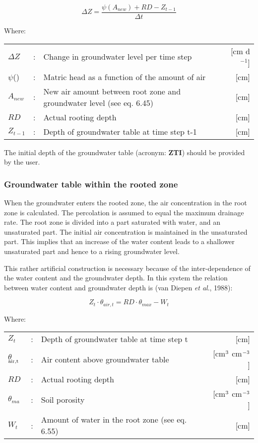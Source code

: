 \begin{equation}
\Delta Z = {\frac{\psi (A_{new} ) + RD - Z_{t-1}}{\Delta t}}
\end{equation}

Where:\\[5pt]
\begin{tabularx}{\textwidth}{llXr}
$\Delta Z$ &:& Change in groundwater level per time step  & [cm d$^{ -1}$]\\
$\psi$() &:& Matric head as a function of the amount of air  & [cm]\\
$A_{new}$ &:& New air amount between root zone and groundwater
   level (see eq. 6.45)  & [cm]\\
$RD$ &:& Actual rooting depth  & [cm]\\
$Z_{t-1}$ &:& Depth of groundwater table at time step t-1  & [cm]
\end{tabularx}

The initial depth of the groundwater table (acronym: {\bf ZTI}) should be provided by the
user. 

\subsubsection{Groundwater table within the rooted zone}
When the groundwater enters the rooted zone, the air concentration in the root zone is
calculated. The percolation is assumed to equal the maximum drainage rate. The root
zone is divided into a part saturated with water, and an unsaturated part. The initial air
concentration is maintained in the unsaturated part. This implies that an increase of the
water content leads to a shallower unsaturated part and hence to a rising groundwater
level.

This rather artificial construction is necessary because of the inter-dependence of the
water content and the groundwater depth. In this system the relation between water
content and groundwater depth is (van Diepen {\it et al}., 1988):

\begin{equation}
Z_{t} \cdot \theta_{air,t} = RD \cdot \theta_{max} - W_{t} 
\end{equation}

Where:\\[5pt]
\begin{tabularx}{\textwidth}{llXr}
$Z_{t}$ &:& Depth of groundwater table at time step t  & [cm]\\
$\theta$$_{{\rm air,t}}$ &:& Air content above groundwater table  & [cm$^{{\rm 3}}$ cm$^{{\rm -3}}$]\\
$RD$ &:& Actual rooting depth  & [cm]\\
$\theta_{ma}$ &:& Soil porosity  & [cm$^{{\rm 3}}$ cm$^{{\rm -3}}$]\\
$W_{ t}$ &:& Amount of water in the root zone (see eq. 6.55)  & [cm]\\
\end{tabularx}

